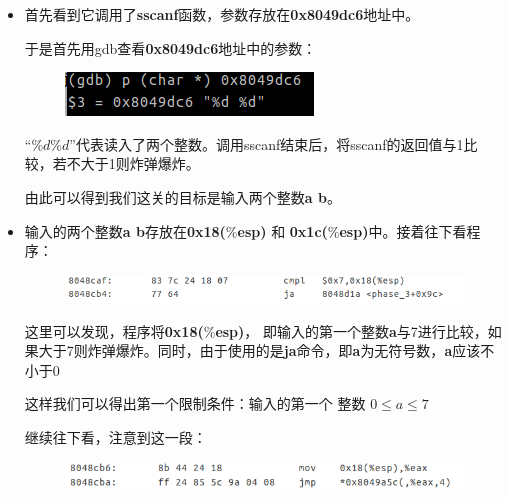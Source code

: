 \begin{itemize}
	\item
	首先看到它调用了\textbf{sscanf}函数，参数存放在\textbf{0x8049dc6}地址中。
	
	于是首先用gdb查看\textbf{0x8049dc6}地址中的参数：

	\begin{figure}[h]
		\centering
			\includegraphics[scale=0.8]{images/phase_3_part_0.png}
	\end{figure}	
	
	“$\%d \%d$”代表读入了两个整数。调用sscanf结束后，将sscanf的返回值与1比较，若不大于1则炸弹爆炸。
	
	由此可以得到我们这关的目标是输入两个整数\textbf{a b}。
	
	\item
	输入的两个整数\textbf{a b}存放在\textbf{0x18($\%$esp)} 和 \textbf{0x1c($\%$esp)}中。接着往下看程序：
		
		
	\begin{figure}[h]
		\centering
			\includegraphics[scale=0.77]{images/phase_3_part_1.png}
	\end{figure}

	这里可以发现，程序将\textbf{0x18($\%$esp)}， 即输入的第一个整数\textbf{a}与7进行比较，如果大于7则炸弹爆炸。同时，由于使用的是\textbf{ja}命令，即\textbf{a}为无符号数，\textbf{a}应该不小于0
	
	这样我们可以得出第一个限制条件：输入的第一个	整数 $0 \le a \le 7$
	
	继续往下看，注意到这一段：	
	\begin{figure}[H]
		\centering
			\includegraphics[scale=0.77]{images/phase_3_part_2.png}
	\end{figure}


\end{itemize}
